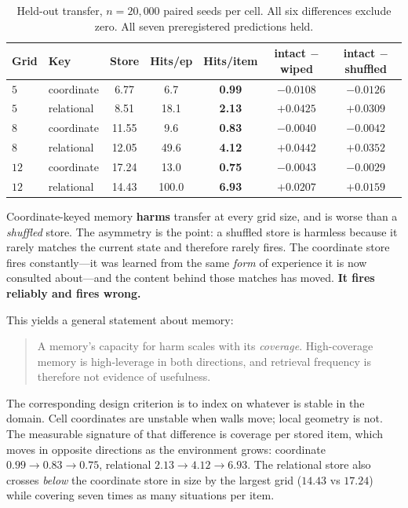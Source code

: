 \documentclass[11pt]{article}
\begin{document}
\begin{table}[h]
\centering
\begin{tabular}{llccccc}
\toprule
Grid & Key & Store & Hits/ep & \textbf{Hits/item} & intact $-$ wiped & intact $-$ shuffled \\
\midrule
$5$ & coordinate & 6.77 & 6.7 & \textbf{0.99} & $-0.0108$ & $-0.0126$ \\
$5$ & relational & 8.51 & 18.1 & \textbf{2.13} & $+0.0425$ & $+0.0309$ \\
$8$ & coordinate & 11.55 & 9.6 & \textbf{0.83} & $-0.0040$ & $-0.0042$ \\
$8$ & relational & 12.05 & 49.6 & \textbf{4.12} & $+0.0442$ & $+0.0352$ \\
$12$ & coordinate & 17.24 & 13.0 & \textbf{0.75} & $-0.0043$ & $-0.0029$ \\
$12$ & relational & 14.43 & 100.0 & \textbf{6.93} & $+0.0207$ & $+0.0159$ \\
\bottomrule
\end{tabular}
\caption{Held-out transfer, $n{=}20{,}000$ paired seeds per cell. All six
differences exclude zero. All seven preregistered predictions held.}
\end{table}

\noindent
Coordinate-keyed memory \textbf{harms} transfer at every grid size, and is
worse than a \emph{shuffled} store. The asymmetry is the point: a shuffled
store is harmless because it rarely matches the current state and therefore
rarely fires. The coordinate store fires constantly---it was learned from the
same \emph{form} of experience it is now consulted about---and the content
behind those matches has moved. \textbf{It fires reliably and fires wrong.}

This yields a general statement about memory:

\begin{quote}
A memory's capacity for harm scales with its \emph{coverage}. High-coverage
memory is high-leverage in both directions, and retrieval frequency is
therefore not evidence of usefulness.
\end{quote}

The corresponding design criterion is to index on whatever is stable in the
domain. Cell coordinates are unstable when walls move; local geometry is not.
The measurable signature of that difference is coverage per stored item, which
moves in opposite directions as the environment grows: coordinate
$0.99 \to 0.83 \to 0.75$, relational $2.13 \to 4.12 \to 6.93$. The relational
store also crosses \emph{below} the coordinate store in size by the largest
grid ($14.43$ vs $17.24$) while covering seven times as many situations per
item.
\end{document}
